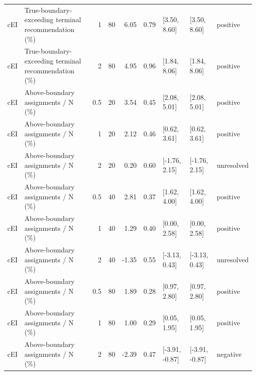 \begin{longtable}{p{1.8cm}p{3.0cm}rrrrp{2.6cm}p{2.6cm}p{1.6cm}}
cEI & True-boundary-exceeding terminal recommendation (\%) & 1 & 80 & 6.05 & 0.79 & [3.50, 8.60] & [3.50, 8.60] & positive \\
cEI & True-boundary-exceeding terminal recommendation (\%) & 2 & 80 & 4.95 & 0.96 & [1.84, 8.06] & [1.84, 8.06] & positive \\
cEI & Above-boundary assignments / N (\%) & 0.5 & 20 & 3.54 & 0.45 & [2.08, 5.01] & [2.08, 5.01] & positive \\
cEI & Above-boundary assignments / N (\%) & 1 & 20 & 2.12 & 0.46 & [0.62, 3.61] & [0.62, 3.61] & positive \\
cEI & Above-boundary assignments / N (\%) & 2 & 20 & 0.20 & 0.60 & [-1.76, 2.15] & [-1.76, 2.15] & unresolved \\
cEI & Above-boundary assignments / N (\%) & 0.5 & 40 & 2.81 & 0.37 & [1.62, 4.00] & [1.62, 4.00] & positive \\
cEI & Above-boundary assignments / N (\%) & 1 & 40 & 1.29 & 0.40 & [0.00, 2.58] & [0.00, 2.58] & positive \\
cEI & Above-boundary assignments / N (\%) & 2 & 40 & -1.35 & 0.55 & [-3.13, 0.43] & [-3.13, 0.43] & unresolved \\
cEI & Above-boundary assignments / N (\%) & 0.5 & 80 & 1.89 & 0.28 & [0.97, 2.80] & [0.97, 2.80] & positive \\
cEI & Above-boundary assignments / N (\%) & 1 & 80 & 1.00 & 0.29 & [0.05, 1.95] & [0.05, 1.95] & positive \\
cEI & Above-boundary assignments / N (\%) & 2 & 80 & -2.39 & 0.47 & [-3.91, -0.87] & [-3.91, -0.87] & negative \\
\bottomrule
\end{longtable}
